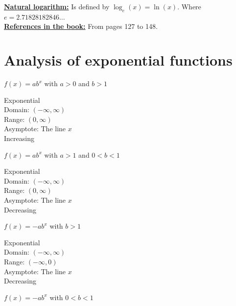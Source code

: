 \underline{\textbf{Natural logarithm:}} Is defined by $\log_e (x) = \ln(x)$.
Where $e = 2.71828182846\ldots$
\\

\underline{\textbf{References in the book:}} From pages 127 to 148.

\newpage
\section{Analysis of exponential functions}

\begin{multicols}{2}

    \hline
    \begin{center}
        $f(x) = ab^x$ with $a > 0$ and $b > 1$

        Exponential\\
        Domain: $(-\infty, \infty)$\\
        Range: $(0, \infty)$\\
        Asymptote: The line $x$ \\
        Increasing
        \vspace{5mm}
    \end{center}
    \hline
    \begin{center}
        $f(x) = ab^x$ with $a>1$ and $0< b < 1$

        Exponential\\
        Domain: $(-\infty, \infty)$\\
        Range: $(0, \infty)$\\
        Asymptote: The line $x$\\
        Decreasing
        \vspace{10mm}
    \end{center}
    \hline
    \begin{center}
        $f(x) = -ab^x$ with $b > 1$

        Exponential\\
        Domain: $(-\infty, \infty)$\\
        Range: $(-\infty, 0)$\\
        Asymptote: The line $x$\\
        Decreasing
        \vspace{10mm}
    \end{center}
    \hline
    \begin{center}
        $f(x) = -ab^x$ with $0 < b < 1$


\end{center}
\end{multicols}
